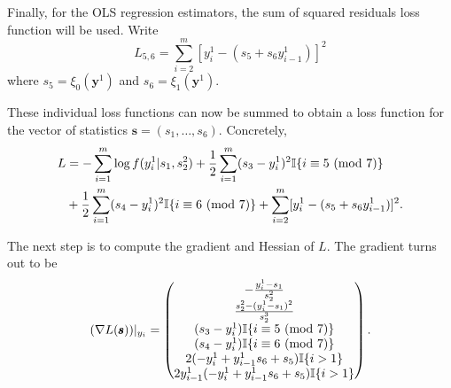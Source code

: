 Finally, for the OLS regression estimators, the sum of squared residuals loss function will be used. Write
\begin{equation}
    L_{5,6} = \sum_{i=2}^m [y^1_i - (s_5 + s_6 y^1_{i-1})]^2
\end{equation}
where $s_5 = \xi_0(\pmb{y}^1)$ and $s_6 = \xi_1(\pmb{y}^1)$.

These individual loss functions can now be summed to obtain a loss function for the vector of statistics $\pmb{s} = (s_1, \ldots, s_6)$. Concretely,
\begin{equation}
    \begin{split}
        L &= -\sum_{i=1}^m \log{f(y^1_i | s_1, s_2^2)} + \frac{1}{2}\sum_{i=1}^m (s_3 - y^1_i)^2 \mathbb{I}\{i \equiv 5 \ (\mathrm{mod}\ 7)\} \\ &+ \frac{1}{2}\sum_{i=1}^m (s_4 - y^1_i)^2 \mathbb{I}\{i \equiv 6 \ (\mathrm{mod}\ 7)\} + \sum_{i=2}^m [y^1_i - (s_5 + s_6 y^1_{i-1})]^2.
    \end{split}
\end{equation}

The next step is to compute the gradient and Hessian of $L$. The gradient turns out to be
\begin{equation}
    (\nabla L(\pmb{s}))|_{y_i} =
    \begin{pmatrix}
        - \frac{y^1_i - s_1}{s_2^2} \\
        \frac{s_2^2 - (y^1_i - s_1)^2}{s_2^3} \\
        (s_3 - y^1_i)\mathbb{I}\{i \equiv 5 \ (\mathrm{mod}\ 7)\} \\
        (s_4 - y^1_i)\mathbb{I}\{i \equiv 6 \ (\mathrm{mod}\ 7)\} \\
        2(-y^1_i + y^1_{i-1}s_6 + s_5)\mathbb{I}\{i > 1\} \\
        2y^1_{i-1}(-y^1_i + y^1_{i-1}s_6 + s_5)\mathbb{I}\{i > 1\}
    \end{pmatrix}.
\end{equation}

